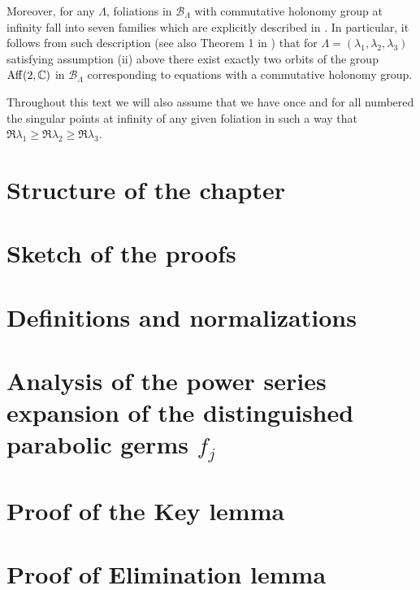 \documentclass[phd,tocprelim]{cornell}
\begin{document}
Moreover, for any $\Lambda$, foliations in $\mathcal{B}_\Lambda$ with commutative holonomy group at infinity fall into seven families which are explicitly described in \cite{Pyartli2006}. In particular, it follows from such description (see also Theorem 1 in \cite{Pyartli2000}) that for $\Lambda=(\lambda_1,\lambda_2,\lambda_3)$ satisfying assumption (ii) above there exist exactly two orbits of the group $\operatorname{Aff}({2},{\mathbb{C}})$ in $\mathcal{B}_\Lambda$ corresponding to equations with a commutative holonomy group.

Throughout this text we will also assume that we have once and for all numbered the singular points at infinity of any given foliation in such a way that $\Re{\lambda_1}\geq\Re{\lambda_2}\geq\Re{\lambda_3}$.




\section{Structure of the chapter}\label{sec:structure}

\section{Sketch of the proofs}\label{sec:sketch}

\section{Definitions and normalizations}\label{sec:normalizations}

\section[Analysis of the power series]{Analysis of the power series expansion of the distinguished parabolic germs \texorpdfstring{$f_j$}{}}\label{sec:analysis}

\section{Proof of the Key lemma}\label{sec:keylemma}

\section{Proof of Elimination lemma}\label{sec:elimination}
\end{document}
